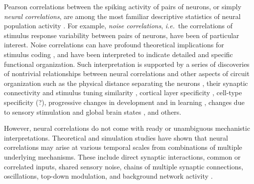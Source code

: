 Pearson correlations between the spiking activity of pairs of neurons, or simply \emph{neural correlations}, are among the most familiar descriptive statistics of neural population activity \citep{Averbeck:2006,Zohary:1994,Kohn:2005,Bair:2001,Renart:2010}.  For example, \emph{noise correlations}, \emph{i.e.}~the correlations of stimulus response variability between pairs of neurons, have been of particular interest.  Noise correlations can have profound theoretical implications for stimulus coding \citep{Zohary:1994,Abbott:1999,Averbeck:2006,Berens:2011,Ecker:2011}, and have been interpreted to indicate detailed and specific functional organization. Such interpretation is supported by a series of discoveries of nontrivial relationships between neural correlations and other aspects of circuit organization such as the physical distance separating the neurons \citep{Smith:2008,Denman:2013}, their synaptic connectivity and stimulus tuning similarity \citep{Kohn:2005,Ko:2011}, cortical layer specificity \citep{Hansen:2012,Smith:2013}, cell-type specificity (?), progressive changes in development and in learning \citep{Golshani:2009}, changes due to sensory stimulation and global brain states \citep{Goard:2009,Kohn:2009,Ecker:2010,Renart:2010}, and others.

However, neural correlations do not come with ready or unambiguous mechanistic interpretations.  Theoretical and simulation studies have shown that neural correlations may arise at various temporal scales from combinations of multiple underlying mechanisms.  These include direct synaptic interactions, common or correlated inputs, shared sensory noise, chains of multiple synaptic connections, oscillations, top-down modulation, and background network activity \citep{Perkel:1967b,Shadlen:1998,Salinas:2001,Ostojic:2009,Rosenbaum:2011}.

